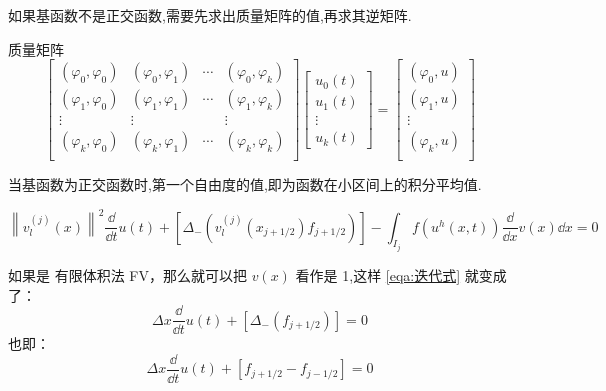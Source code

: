\documentclass{book}
\begin{document}
\begin{remark}
    如果基函数不是正交函数,需要先求出质量矩阵的值,再求其逆矩阵.

    质量矩阵
    \begin{equation}
        \begin{bmatrix}
            (\varphi_0,\varphi_0) & (\varphi_0,\varphi_1) & \cdots & (\varphi_0,\varphi_k) \\
            (\varphi_1,\varphi_0) & (\varphi_1,\varphi_1) & \cdots & (\varphi_1,\varphi_k) \\
            \vdots                & \vdots                &        & \vdots                \\
            (\varphi_k,\varphi_0) & (\varphi_k,\varphi_1) & \cdots & (\varphi_k,\varphi_k) \\
        \end{bmatrix}
        \begin{bmatrix}
            u_0(t) \\
            u_1(t) \\
            \vdots \\
            u_k(t)
        \end{bmatrix}
        =
        \begin{bmatrix}
            (\varphi_0,u) \\
            (\varphi_1,u) \\
            \vdots        \\
            (\varphi_k,u) \\
        \end{bmatrix}
    \end{equation}

\end{remark}
\begin{remark}
    当基函数为正交函数时,第一个自由度的值,即为函数在小区间上的积分平均值.
\end{remark}
\begin{equation}
    \label{eqa:迭代式}
    \left\|v_{l}^{(j)}(x)\right\|^{2} \dfrac{\dd}{\dd t} u(t)+\left[\Delta_{-}\left(v_{l}^{(j)}\left(x_{j+1 / 2}\right) f_{j+1 / 2}\right)\right]-\int_{I_{j}} f\left(u^{h}(x, t)\right) \dfrac{\dd}{\dd x} v(x) \dd x=0
\end{equation}
\begin{remark}
    如果是 有限体积法 FV，那么就可以把 $v(x)$ 看作是 1,这样 \eqref{eqa:迭代式} 就变成了：
    \begin{equation}
        \Delta x \dfrac{\dd}{\dd t} u(t)+\left[\Delta_{-}\left(f_{j+1 / 2}\right)\right]=0
    \end{equation}
    也即：
    \begin{equation}
        \Delta x \dfrac{\dd}{\dd t} u(t)+\left[f_{j+1 / 2}-f_{j-1 / 2}\right]=0
    \end{equation}
\end{remark}
\end{document}
